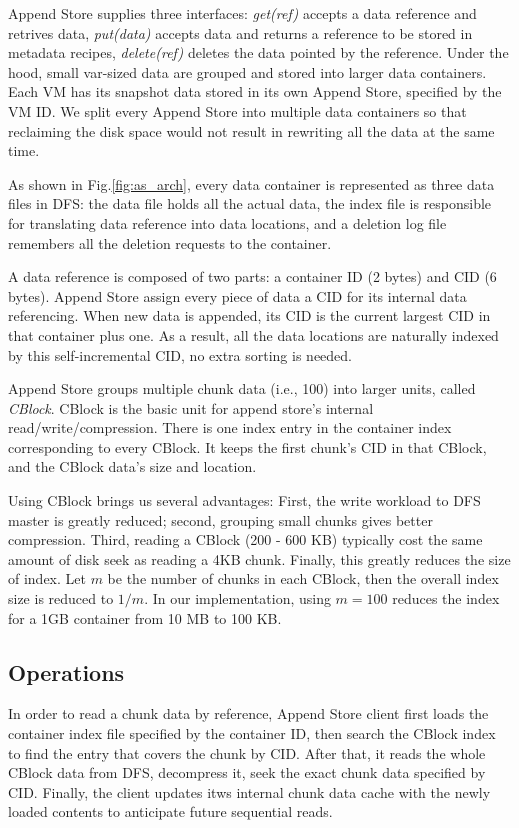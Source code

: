 Append Store supplies three interfaces: {\em get(ref)} accepts a data reference and retrives data, 
{\em put(data)} accepts data and returns a reference to be stored in metadata recipes, 
{\em delete(ref)} 
deletes the data pointed by the reference.
Under the hood, small var-sized data are grouped and stored into larger data containers. Each VM has
its snapshot data stored in its own Append Store, specified by the VM ID. 
We split every Append Store into multiple data containers so that reclaiming the disk space would not 
result in rewriting all the data at the same time.

As shown in Fig.\ref{fig:as_arch}, every data container is represented as three data files in DFS:
the data file holds all the actual data, the index file is responsible for translating data reference
into data locations, and a deletion log file remembers all the deletion requests to the container.

A data reference is composed of two parts: a container ID (2 bytes) and CID (6 bytes).
Append Store assign every piece of data a CID for its internal data referencing. 
When new data is appended, its CID is the current largest CID in that container plus one.
As a result, all the data locations are naturally indexed by this self-incremental CID, 
no extra sorting is needed.

Append Store groups multiple chunk data (i.e., 100) into larger units, called {\em CBlock}.
CBlock is the basic unit for append store's internal read/write/compression.
There is one index entry in the container index corresponding to every CBlock. It keeps the first chunk's CID
in that CBlock, and the CBlock data's size and location.

Using CBlock brings us several advantages: First, the write workload to DFS master is greatly reduced; second, grouping
small chunks gives better compression. Third, reading a CBlock (200 - 600 KB) typically cost the same amount of disk 
seek as reading a 4KB chunk. Finally, this greatly reduces the size of index. Let $m$ be the number of chunks in each
CBlock, then the overall index size is reduced to $1/m$. In our implementation, using $m=100$ reduces the index for
a 1GB container from 10 MB to 100 KB.

\subsection{Operations}
In order to read a chunk data by reference, Append Store client first loads the
container index file specified by the container ID, then search the CBlock index to find the entry that covers the chunk by CID.
After that, it reads the whole CBlock data from DFS, decompress it, seek the exact chunk data specified by CID. 
Finally, the client updates itws internal chunk data cache with the newly loaded contents to anticipate future sequential reads.

